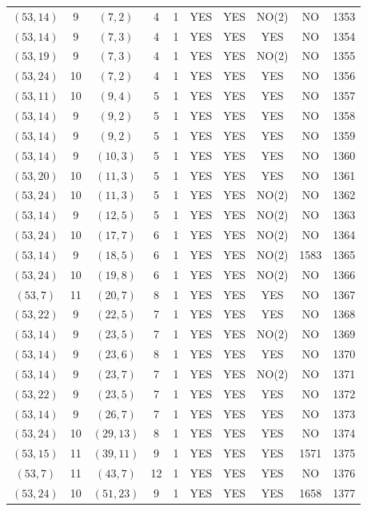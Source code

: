 \begin{longtable}{|c|c|c|c|c|c|c|c|c|c|}
$(53, 14)$ & 9 & $(7, 2)$ & 4 & 1 & YES & YES & NO(2) & NO & 1353\\
$(53, 14)$ & 9 & $(7, 3)$ & 4 & 1 & YES & YES & YES & NO & 1354\\
$(53, 19)$ & 9 & $(7, 3)$ & 4 & 1 & YES & YES & NO(2) & NO & 1355\\
$(53, 24)$ & 10 & $(7, 2)$ & 4 & 1 & YES & YES & YES & NO & 1356\\
$(53, 11)$ & 10 & $(9, 4)$ & 5 & 1 & YES & YES & YES & NO & 1357\\
$(53, 14)$ & 9 & $(9, 2)$ & 5 & 1 & YES & YES & YES & NO & 1358\\
$(53, 14)$ & 9 & $(9, 2)$ & 5 & 1 & YES & YES & YES & NO & 1359\\
$(53, 14)$ & 9 & $(10, 3)$ & 5 & 1 & YES & YES & YES & NO & 1360\\
$(53, 20)$ & 10 & $(11, 3)$ & 5 & 1 & YES & YES & YES & NO & 1361\\
$(53, 24)$ & 10 & $(11, 3)$ & 5 & 1 & YES & YES & NO(2) & NO & 1362\\
$(53, 14)$ & 9 & $(12, 5)$ & 5 & 1 & YES & YES & NO(2) & NO & 1363\\
$(53, 24)$ & 10 & $(17, 7)$ & 6 & 1 & YES & YES & NO(2) & NO & 1364\\
$(53, 14)$ & 9 & $(18, 5)$ & 6 & 1 & YES & YES & NO(2) & 1583 & 1365\\
$(53, 24)$ & 10 & $(19, 8)$ & 6 & 1 & YES & YES & NO(2) & NO & 1366\\
$(53, 7)$ & 11 & $(20, 7)$ & 8 & 1 & YES & YES & YES & NO & 1367\\
$(53, 22)$ & 9 & $(22, 5)$ & 7 & 1 & YES & YES & YES & NO & 1368\\
$(53, 14)$ & 9 & $(23, 5)$ & 7 & 1 & YES & YES & NO(2) & NO & 1369\\
$(53, 14)$ & 9 & $(23, 6)$ & 8 & 1 & YES & YES & YES & NO & 1370\\
$(53, 14)$ & 9 & $(23, 7)$ & 7 & 1 & YES & YES & NO(2) & NO & 1371\\
$(53, 22)$ & 9 & $(23, 5)$ & 7 & 1 & YES & YES & YES & NO & 1372\\
$(53, 14)$ & 9 & $(26, 7)$ & 7 & 1 & YES & YES & YES & NO & 1373\\
$(53, 24)$ & 10 & $(29, 13)$ & 8 & 1 & YES & YES & YES & NO & 1374\\
$(53, 15)$ & 11 & $(39, 11)$ & 9 & 1 & YES & YES & YES & 1571 & 1375\\
$(53, 7)$ & 11 & $(43, 7)$ & 12 & 1 & YES & YES & YES & NO & 1376\\
$(53, 24)$ & 10 & $(51, 23)$ & 9 & 1 & YES & YES & YES & 1658 & 1377\\

\end{longtable}
